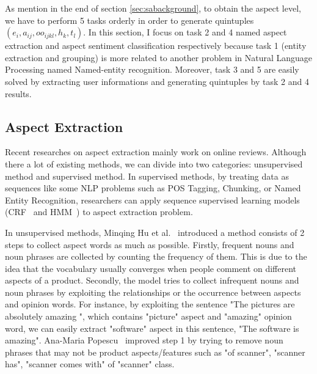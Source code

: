 \documentclass{article}
\begin{document}
As mention in the end of section \ref{sec:sabackground}, to obtain the aspect level, we have to perform 5 tasks orderly in order to generate quintuples $(e_i, a_{ij}, oo_{ijkl}, h_k, t_l)$.
In this section, I focus on task 2 and 4 named aspect extraction and aspect sentiment classification respectively because task 1 (entity extraction and grouping) is more related to another problem in Natural Language Processing named Named-entity recognition.
Moreover, task 3 and 5 are easily solved by extracting user informations and generating quintuples by task 2 and 4 results.

\subsection{Aspect Extraction}
Recent researches on aspect extraction mainly work on online reviews. Although there a lot of existing methods, we can divide into two categories: unsupervised method and supervised method. 
In supervised methods, by treating data as sequences like some NLP problems such as POS Tagging, Chunking, or Named Entity Recognition, researchers can apply sequence supervised learning models (CRF~\cite{Jakob:2010:EOT:1870658.1870759,Lafferty:2001:CRF:645530.655813} and HMM~\cite{Freitag00informationextraction,Jin:2009:NLH:1553374.1553435,Ding:2008:HLA:1341531.1341561}) to aspect extraction problem.

In unsupervised methods, Minqing Hu et al.~\cite{Hu:2004:MSC:1014052.1014073}  introduced a method consists of 2 steps to collect aspect words as much as possible. 
Firstly, frequent nouns and noun phrases are collected by counting the frequency of them.
This is due to the idea that the vocabulary usually converges when people comment on different aspects of a product.
Secondly, the model tries to collect infrequent nouns and noun phrases by exploiting the relationships or the occurrence between aspects and opinion words.
For instance, by exploiting the sentence "The pictures are absolutely amazing    ", which contains "picture" aspect and "amazing" opinion word, we can easily extract "software" aspect in this sentence, "The software is amazing".
Ana-Maria Popescu~\cite{Popescu:2005:EPF:1220575.1220618} improved step 1 by trying to remove noun phrases that may not be product aspects/features such as "of scanner", "scanner has", "scanner comes with" of "scanner" class.
\end{document}
